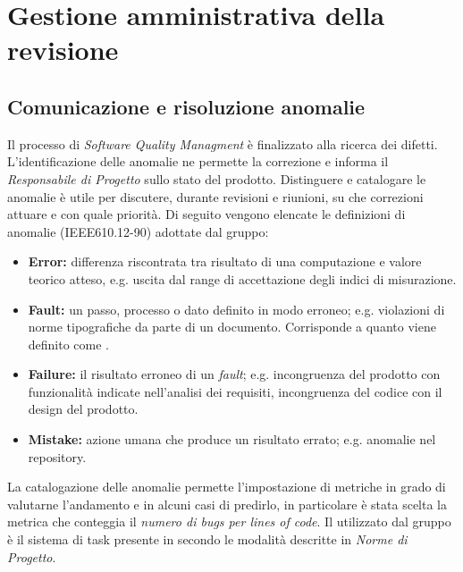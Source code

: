 \clearpage
\section{Gestione amministrativa della revisione}
	\subsection{Comunicazione e risoluzione anomalie}
	Il processo di \emph{Software Quality Managment} è finalizzato alla ricerca dei difetti. L'identificazione delle anomalie ne permette la correzione e informa il \emph{Responsabile di Progetto} sullo stato del prodotto. Distinguere e catalogare le anomalie è utile per discutere, durante revisioni e riunioni, su che correzioni attuare e con quale priorità. Di seguito vengono elencate le definizioni di anomalie (IEEE610.12-90) adottate dal gruppo:
	\begin{itemize}
		\item \textbf{Error:} differenza riscontrata tra risultato di una computazione e valore teorico atteso, e.g. uscita dal range di accettazione degli indici di misurazione.
		\item \textbf{Fault:} un passo, processo o dato definito in modo erroneo; e.g. violazioni di norme tipografiche da parte di un documento. Corrisponde a quanto viene definito come .
		\item \textbf{Failure:} il risultato erroneo di un \emph{fault}; e.g. incongruenza del prodotto con funzionalità indicate nell'analisi dei requisiti, incongruenza del codice con il design del prodotto.
		\item \textbf{Mistake:} azione umana che produce un risultato errato; e.g. anomalie nel repository.
	\end{itemize}
	La catalogazione delle anomalie permette l'impostazione di metriche in grado di valutarne l'andamento e in alcuni casi di predirlo, in particolare è stata scelta la metrica che conteggia il \emph{numero di bugs per lines of code}. Il  utilizzato dal gruppo è il sistema di task presente in   secondo le modalità descritte in \emph{Norme di Progetto}.


